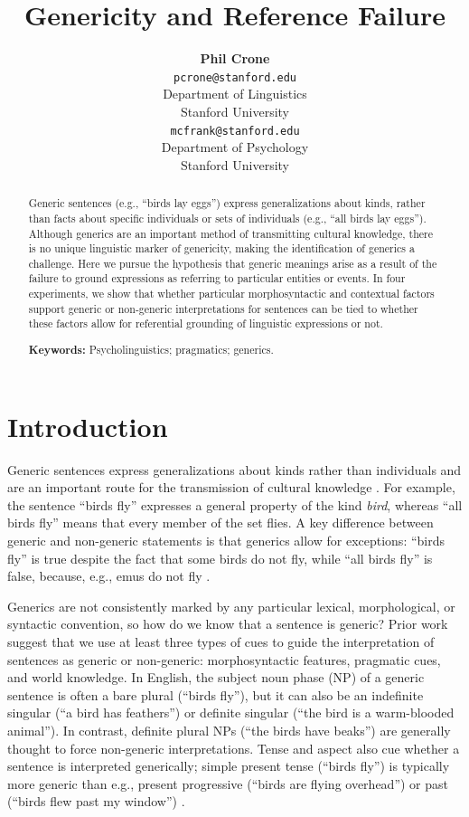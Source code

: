\documentclass[10pt,letterpaper]{article}
\title{Genericity and Reference Failure}
\author{{\large \bf Phil Crone} \\
	\texttt{pcrone@stanford.edu}\\
  Department of Linguistics \\
  Stanford University
  \And {\large \bf Michael C. Frank} \\
  \texttt{mcfrank@stanford.edu}\\
  Department of Psychology \\
  Stanford University}
\begin{document}
\maketitle

\begin{abstract}
Generic sentences (e.g., ``birds lay eggs'') express generalizations about kinds, rather than facts about specific individuals or sets of individuals (e.g., ``all birds lay eggs''). Although generics are an important method of transmitting cultural knowledge, there is no unique linguistic marker of genericity, making the identification of generics a challenge. Here we pursue the hypothesis that generic meanings arise as a result of the failure to ground expressions as referring to particular entities or events. In four experiments, we show that whether particular morphosyntactic and contextual factors support generic or non-generic interpretations for sentences can be tied to whether these factors allow for referential grounding of linguistic expressions or not. 

\textbf{Keywords:} Psycholinguistics; pragmatics; generics.
\end{abstract}


\section{Introduction}
 
Generic sentences express generalizations about kinds rather than individuals and are an important route for the transmission of cultural knowledge \cite{gelman2003}. For example, the sentence ``birds fly'' expresses a general property of the kind \textit{bird}, whereas ``all birds fly'' means that every member of the set flies. A key difference between generic and non-generic statements is that generics allow for exceptions: ``birds fly'' is true despite the fact that some birds do not fly, while ``all birds fly'' is false, because, e.g., emus do not fly \cite{Prasada:2000}. 

Generics are not consistently marked by any particular lexical, morphological, or syntactic convention, so how do we know that a sentence is generic? Prior work suggest that we use at least three types of cues to guide the interpretation of sentences as generic or non-generic: morphosyntactic features, pragmatic cues, and world knowledge. In English, the subject noun phase (NP) of a generic sentence is often a bare plural (``birds fly''), but it can also be an indefinite singular (``a bird has feathers'') or definite singular (``the bird is a warm-blooded animal''). In contrast, definite plural NPs (``the birds have beaks'') are generally thought to force non-generic interpretations. Tense and aspect also cue whether a sentence is interpreted generically; simple present tense (``birds fly'') is typically more generic than e.g., present progressive (``birds are flying overhead'') or past (``birds flew past my window'') \cite{Carlson:1977,Krifka:1995,Lyons:1977}. 
\end{document}
